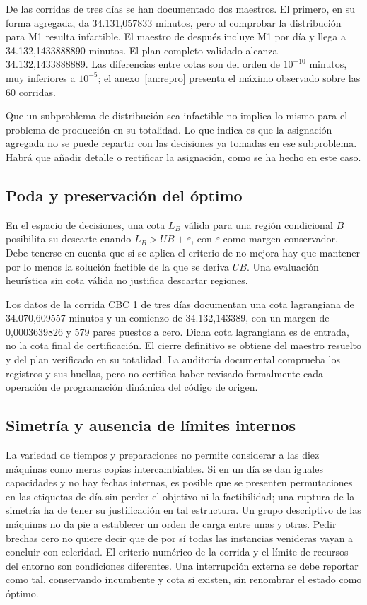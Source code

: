 \documentclass[12pt,a4paper,oneside]{article}
\begin{document}
De las corridas de tres días se han documentado dos maestros. El primero, en su forma agregada, da 34.131,057833 minutos, pero al comprobar la distribución para M1 resulta infactible. El maestro de después incluye M1 por día y llega a 34.132,1433888890 minutos. El plan completo validado alcanza 34.132,1433888889. Las diferencias entre cotas son del orden de $10^{-10}$ minutos, muy inferiores a $10^{-5}$; el anexo~\ref{an:repro} presenta el máximo observado sobre las 60 corridas.

Que un subproblema de distribución sea infactible no implica lo mismo para el problema de producción en su totalidad. Lo que indica es que la asignación agregada no se puede repartir con las decisiones ya tomadas en ese subproblema. Habrá que añadir detalle o rectificar la asignación, como se ha hecho en este caso.

\subsection{Poda y preservación del óptimo}
En el espacio de decisiones, una cota $L_B$ válida para una región condicional $B$ posibilita su descarte cuando $L_B>UB+\varepsilon$, con $\varepsilon$ como margen conservador. Debe tenerse en cuenta que si se aplica el criterio de no mejora hay que mantener por lo menos la solución factible de la que se deriva $UB$. Una evaluación heurística sin cota válida no justifica descartar regiones.

Los datos de la corrida CBC 1 de tres días documentan una cota lagrangiana de 34.070,609557 minutos y un comienzo de 34.132,143389, con un margen de 0,0003639826 y 579 pares puestos a cero. Dicha cota lagrangiana es de entrada, no la cota final de certificación. El cierre definitivo se obtiene del maestro resuelto y del plan verificado en su totalidad. La auditoría documental comprueba los registros y sus huellas, pero no certifica haber revisado formalmente cada operación de programación dinámica del código de origen.

\subsection{Simetría y ausencia de límites internos}
La variedad de tiempos y preparaciones no permite considerar a las diez máquinas como meras copias intercambiables. Si en un día se dan iguales capacidades y no hay fechas internas, es posible que se presenten permutaciones en las etiquetas de día sin perder el objetivo ni la factibilidad; una ruptura de la simetría ha de tener su justificación en tal estructura. Un grupo descriptivo de las máquinas no da pie a establecer un orden de carga entre unas y otras. Pedir brechas cero no quiere decir que de por sí todas las instancias venideras vayan a concluir con celeridad. El criterio numérico de la corrida y el límite de recursos del entorno son condiciones diferentes. Una interrupción externa se debe reportar como tal, conservando incumbente y cota si existen, sin renombrar el estado como óptimo.
\end{document}
